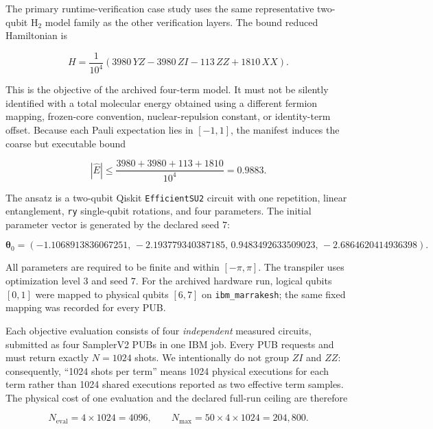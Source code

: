 The primary runtime-verification case study uses the same representative
two-qubit $\mathrm{H}_2$ model family as the other verification layers.  The
bound reduced Hamiltonian is

\begin{equation}
  H = \frac{1}{10^4}
  \left(3980\,YZ - 3980\,ZI - 113\,ZZ + 1810\,XX\right).
  \label{eq:rv-h2-hamiltonian}
\end{equation}

This is the objective of the archived four-term model.  It must not be silently
identified with a total molecular energy obtained using a different fermion
mapping, frozen-core convention, nuclear-repulsion constant, or identity-term
offset.  Because each Pauli expectation lies in $[-1,1]$, the manifest induces
the coarse but executable bound

\begin{equation}
  |\widehat{E}| \le
  \frac{3980+3980+113+1810}{10^4}=0.9883.
  \label{eq:rv-energy-bound}
\end{equation}

The ansatz is a two-qubit Qiskit \texttt{EfficientSU2} circuit with one
repetition, linear entanglement, \texttt{ry} single-qubit rotations, and four
parameters.  The initial parameter vector is generated by the declared seed
$7$:

\begin{equation}
  \boldsymbol{\theta}_0 =
  (-1.1068913836067251,\,-2.193779340387185,\,
    0.9483492633509023,\,-2.6864620414936398).
  \label{eq:rv-initial-theta}
\end{equation}

All parameters are required to be finite and within $[-\pi,\pi]$.  The
transpiler uses optimization level $3$ and seed $7$.  For the archived hardware
run, logical qubits $[0,1]$ were mapped to physical qubits $[6,7]$ on
\texttt{ibm\_marrakesh}; the same fixed mapping was recorded for every PUB.

Each objective evaluation consists of four \emph{independent} measured
circuits, submitted as four SamplerV2 PUBs in one IBM job.  Every PUB requests
and must return exactly $N=1024$ shots.  We intentionally do not group
$ZI$ and $ZZ$: consequently, ``1024 shots per term'' means 1024 physical
executions for each term rather than 1024 shared executions reported as two
effective term samples.  The physical cost of one evaluation and the declared
full-run ceiling are therefore

\begin{equation}
  N_{\mathrm{eval}}=4\times1024=4096,
  \qquad
  N_{\max}=50\times4\times1024=204{,}800.
  \label{eq:rv-shot-budget}
\end{equation}

